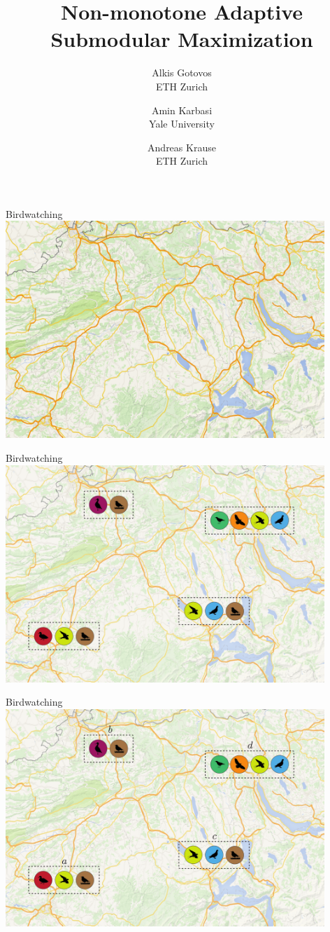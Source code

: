 \documentclass[xetex,10pt,mathserif]{beamer}
\title[Non-monotone Adaptive Submodular Maximization]
{Non-monotone Adaptive Submodular Maximization}
\author[Alkis Gotovos]{
\vspace{1in}
\normalsize
\parbox{1in}{Alkis Gotovos\\{\footnotesize ETH Zurich}}\and
\parbox{1in}{Amin Karbasi\\{\footnotesize Yale University}}\and
\parbox{1in}{Andreas Krause\\{\footnotesize ETH Zurich}}
}
\date[May 4, 2015]{
\begin{center}
{\normalsize
ICML '15
}
\end{center}
}
\begin{document}


\begin{frame}{Birdwatching}
\centering
\includegraphics[width=4.75in]{figures/map.pdf}
\end{frame}

\begin{frame}{Birdwatching}
\centering
\includegraphics[width=4.75in]{figures/intro.pdf}
\end{frame}

\begin{frame}{Birdwatching}
\centering
\includegraphics[width=4.75in]{figures/intro_1.pdf}
\end{frame}
\end{document}
